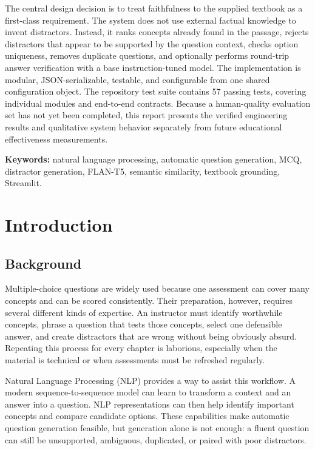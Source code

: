 \documentclass[12pt,a4paper]{report}
\begin{document}
The central design decision is to treat faithfulness to the supplied textbook as a first-class requirement. The system does not use external factual knowledge to invent distractors. Instead, it ranks concepts already found in the passage, rejects distractors that appear to be supported by the question context, checks option uniqueness, removes duplicate questions, and optionally performs round-trip answer verification with a base instruction-tuned model. The implementation is modular, JSON-serializable, testable, and configurable from one shared configuration object. The repository test suite contains 57 passing tests, covering individual modules and end-to-end contracts. Because a human-quality evaluation set has not yet been completed, this report presents the verified engineering results and qualitative system behavior separately from future educational effectiveness measurements.

\textbf{Keywords:} natural language processing, automatic question generation, MCQ, distractor generation, FLAN-T5, semantic similarity, textbook grounding, Streamlit.

\clearpage
\tableofcontents
\clearpage
{}

\chapter{Introduction}
\section{Background}
Multiple-choice questions are widely used because one assessment can cover many concepts and can be scored consistently. Their preparation, however, requires several different kinds of expertise. An instructor must identify worthwhile concepts, phrase a question that tests those concepts, select one defensible answer, and create distractors that are wrong without being obviously absurd. Repeating this process for every chapter is laborious, especially when the material is technical or when assessments must be refreshed regularly.

Natural Language Processing (NLP) provides a way to assist this workflow. A modern sequence-to-sequence model can learn to transform a context and an answer into a question. NLP representations can then help identify important concepts and compare candidate options. These capabilities make automatic question generation feasible, but generation alone is not enough: a fluent question can still be unsupported, ambiguous, duplicated, or paired with poor distractors.
\end{document}
